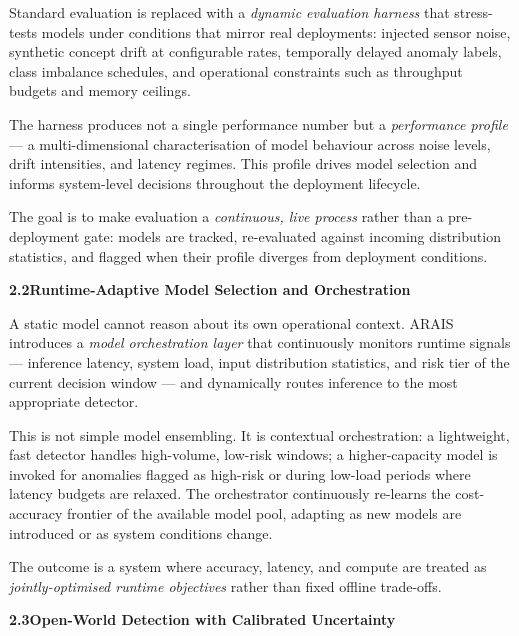 \documentclass[11pt, a4paper]{article}
\newcommand{\pillar}[1]{\textbf{\textcolor{primary}{#1}}}
\begin{document}
\begin{visionbox}
Standard evaluation is replaced with a \textit{dynamic evaluation harness} that stress-tests models 
under conditions that mirror real deployments: injected sensor noise, synthetic concept drift 
at configurable rates, temporally delayed anomaly labels, class imbalance schedules, 
and operational constraints such as throughput budgets and memory ceilings.

The harness produces not a single performance number but a \textit{performance profile} — 
a multi-dimensional characterisation of model behaviour across noise levels, drift intensities, 
and latency regimes. This profile drives model selection and informs system-level decisions 
throughout the deployment lifecycle.

The goal is to make evaluation a \textit{continuous, live process} rather than a 
pre-deployment gate: models are tracked, re-evaluated against incoming distribution statistics, 
and flagged when their profile diverges from deployment conditions.
\end{visionbox}

\vspace{10pt}
\noindent\pillar{2.2\quad Runtime-Adaptive Model Selection and Orchestration}
\vspace{4pt}

\begin{visionbox}
A static model cannot reason about its own operational context.
ARAIS introduces a \textit{model orchestration layer} that continuously monitors runtime signals —
inference latency, system load, input distribution statistics, and risk tier of the 
current decision window — and dynamically routes inference to the most appropriate detector.

This is not simple model ensembling. It is contextual orchestration: a lightweight, fast detector 
handles high-volume, low-risk windows; a higher-capacity model is invoked for anomalies flagged 
as high-risk or during low-load periods where latency budgets are relaxed.
The orchestrator continuously re-learns the cost-accuracy frontier of the available model pool, 
adapting as new models are introduced or as system conditions change.

The outcome is a system where accuracy, latency, and compute are treated as 
\textit{jointly-optimised runtime objectives} rather than fixed offline trade-offs.
\end{visionbox}

\vspace{10pt}
\noindent\pillar{2.3\quad Open-World Detection with Calibrated Uncertainty}
\vspace{4pt}
\end{document}
